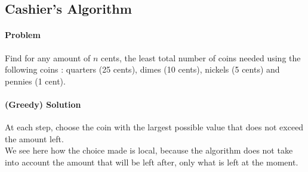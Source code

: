 \documentclass[10pt,a4paper]{book}
\newcommand{\ind}{\hspace*{\parindent}}
\begin{document}
\subsection{Cashier's Algorithm}
\paragraph*{Problem}
Find for any amount of $n$ cents, the least total number of coins needed using the following coins : quarters (25 cents), dimes (10 cents), nickels (5 cents) and pennies (1 cent).
\paragraph*{(Greedy) Solution}
At each step, choose the coin with the largest possible value that does not exceed the amount left. \\
\ind We see here how the choice made is local, because the algorithm does not take into account the amount that will be left after, only what is left at the moment.
\end{document}
